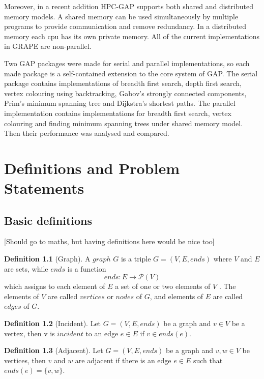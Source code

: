 \documentclass{report}
\theoremstyle{plain}
\theoremstyle{definition}
\newtheorem{definition}{Definition}
\theoremstyle{remark}
\begin{document}
Moreover, in a recent addition HPC-GAP supports both shared and distributed memory models. A shared memory can be used simultaneously by multiple programs to provide communication and remove redundancy. In a distributed memory each cpu has its own private memory. All of the current implementations in GRAPE are non-parallel.

Two GAP packages were made for serial and parallel implementations, so each made package is a self-contained extension to the core system of GAP. The serial package contains implementations of breadth first search, depth first search, vertex colouring using backtracking, Gabov's strongly connected components, Prim's minimum spanning tree and Dijkstra's shortest paths. The parallel implementation contains implementations for breadth first search, vertex colouring and finding minimum spanning trees under shared memory model. Then their performance was analysed and compared.

\chapter{Definitions and Problem Statements}

\section*{Basic definitions}

[Should go to maths, but having definitions here would be nice too]

\begin{definition}[Graph]
A $graph$  $G$ is a triple $G = (V, E, ends)$ where $V$ and $E$ are sets, while $ends$ is a function 
  \begin{equation}
  ends:E\to \mathcal P \left({V}\right)
  \end{equation}
which assigns to each element of $E$ a set of one or two elements of $V$ . The elements of $V$ are called $vertices$ or $nodes$ of $G$, and elements of $E$ are called $edges$ of $G$.
\end{definition}

\begin{definition}[Incident]
Let $G = (V, E, ends)$ be a graph and $v\in V$ be a vertex, then v is $incident$ to an edge $e \in E$ if $v \in ends(e)$.
\end{definition}

\begin{definition}[Adjacent]
Let $G = (V, E, ends)$ be a graph and $v,w\in V$ be vertices, then $v$ and $w$ are adjacent if there is an edge $ e \in E$ such that $ends(e) = \{v, w\}$.
\end{definition}
\end{document}
